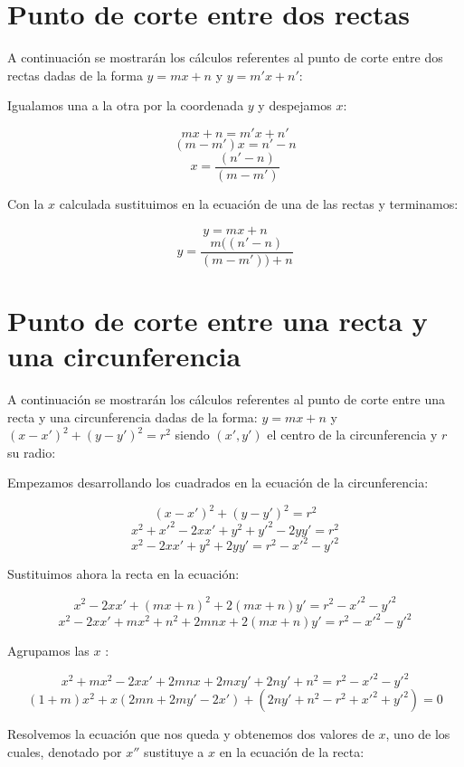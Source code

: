 
\section{Punto de corte entre dos rectas}\label{r-r}

A continuación se mostrarán los cálculos referentes al punto de corte entre dos rectas dadas de la forma $y = mx + n$ y $y = m'x + n'$: \par

Igualamos una a la otra por la coordenada $y$ y despejamos $x$:\par

$$mx+n = m'x+n'$$
$$(m-m')x = n'-n$$
$$x = \frac{(n'-n)}{(m-m')}$$

Con la $x$ calculada sustituimos en la ecuación de una de las rectas y terminamos:\par

$$y = mx+n$$
$$y = \frac{m((n'-n)}{(m-m')) + n}$$

\section{Punto de corte entre una recta y una circunferencia}\label{r-c}

A continuación se mostrarán los cálculos referentes al punto de corte entre una recta y una circunferencia dadas de la forma: $y = mx + n$ y $(x-x')^2 + (y -y')^2 = r^2$ siendo $(x', y')$ el centro de la circunferencia y $r$ su radio: \par

Empezamos desarrollando los cuadrados en la ecuación de la circunferencia:\par

$$(x-x')^2 + (y -y')^2 = r^2$$
$$x^2 + x'^2 - 2xx' + y^2 + y'^2 - 2yy' = r^2$$
$$x^2 - 2xx' + y^2 + 2yy' = r^2 - x'^2 - y'^2$$

Sustituimos ahora la recta en la ecuación:\par


$$x^2 - 2xx' + (mx + n)^2 + 2(mx + n)y' = r^2 - x'^2 - y'^2$$
$$x^2 - 2xx' + mx^2 + n^2 + 2mnx + 2(mx + n)y' = r^2 - x'^2 - y'^2$$

Agrupamos las $x$ :\par


$$x^2 + mx^2 - 2xx' + 2mnx + 2mxy' + 2ny' + n^2 = r^2 - x'^2 - y'^2$$
$$(1+m)x^2 + x( 2mn + 2my' - 2x' ) + (2ny' + n^2 - r^2 + x'^2 + y'^2) = 0$$

Resolvemos la ecuación que nos queda y obtenemos dos valores de $x$, uno de los cuales, denotado por $x''$ sustituye a $x$ en la ecuación de la recta:\par

